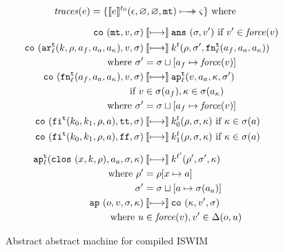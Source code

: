 \documentclass[preprint,onecolumn,9pt]{sigplanconf} %
\begin{document}
\begin{figure}
\begin{gather*}
\begin{align*}
\traces(\mexp) &= \{ \compile{\mexp}^\mtcntr(\epsilon,\varnothing,\varnothing,\kmt) \multimachstep \mstate \} \text{ where }
\end{align*}
\\[2mm]
\begin{align*}
\co{\kmt,\mval,\msto} &\cmachstep
\ans{\msto,\mval'} \text{ if } \mval' \in \spchoice{\force(\msto,\mval)}{\force(\mval)}
\\
\co{\kar[^\mcntr_\mlab]{\mcomp,\menv,\maddr_f,\maddr_a,\maddr_\mkont},\mval,\msto} & \cmachstep
\mcomp^\mcntr(\menv,\msto',\kfn[^\mcntr_\mlab]{\maddr_f,\maddr_a,\maddr_\mkont}) \\
\text{ where } \msto' &= \msto\sqcup[\maddr_f \mapsto \spchoice{\force(\msto,\mval)}
                                                              {\force(\mval)}]
\\
\co{\kfn[^\mcntr_\mlab]{\maddr_f,\maddr_a,\maddr_\mkont},\mval,\msto} & \cmachstep
\ap[^\mcntr_\mlab]{\mval,\maddr_a,\mkont,\msto'} \\
\text{ if }\mval &\in \msto(\maddr_f), \mkont \in \msto(\maddr_\mkont) \\
\text{ where } \msto' &= \msto\sqcup[\maddr_f \mapsto \spchoice{\force(\msto,\mval)}
                                                               {\force(\mval)}]
\\
\co{\kif[^\mcntr]{\mcompi0,\mcompi1,\menv,\maddr},\strue,\msto} & \cmachstep
\mcompi0^\mcntr(\menv,\msto,\mkont)
\text{ if }\mkont\in\msto(\maddr)
\\
\co{\kif[^\mcntr]{\mcompi0,\mcompi1,\menv,\maddr},\sfalse,\msto} & \cmachstep
\mcompi1^\mcntr(\menv,\msto,\mkont)
\text{ if }\mkont\in\msto(\maddr)
\\[2mm]
\ap[^\mcntr_\mlab]{\clos{\mvar,\mcomp,\menv},\maddr_a,\msto,\mkont} & \cmachstep
\mcomp^{\mcntr'}(\menv',\msto',\mkont) \\
\text{ where }\menv' &= \menv[\mvar\mapsto\maddr] \\
              \msto' &= \msto\sqcup[\maddr\mapsto\msto(\maddr_a)]
\\
\ap{\mop,\mval,\msto,\mkont} & \cmachstep
\co{\mkont,\mval',\msto} \\
\text{ where } \mvalx{u} &\in \spchoice{\force(\msto,\mval)}{\force(\mval)}, \mval'\in\interpdelta(\mop,\mvalx{u})
\end{align*}
\end{gather*}
\caption{Abstract abstract machine for compiled ISWIM}
\label{fig:caam}
\end{figure}
\end{document}
